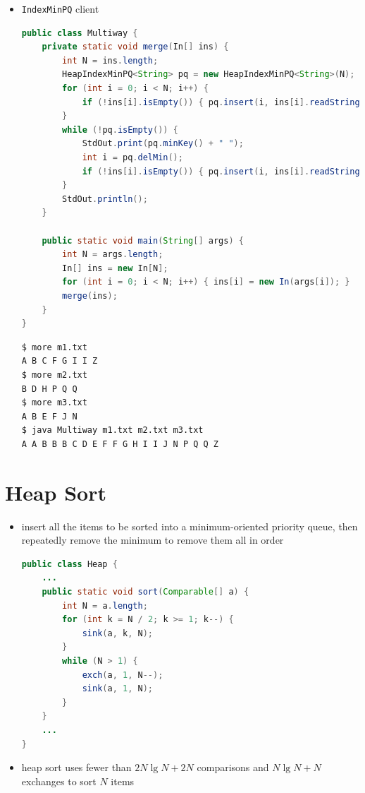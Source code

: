 \documentclass[8pt,a4paper,compress]{beamer}
\begin{document}
\begin{frame}[fragile]
\begin{itemize}
\item \lstinline{IndexMinPQ} client
\begin{lstlisting}[language=Java]
public class Multiway { 
    private static void merge(In[] ins) { 
        int N = ins.length; 
        HeapIndexMinPQ<String> pq = new HeapIndexMinPQ<String>(N); 
        for (int i = 0; i < N; i++) { 
            if (!ins[i].isEmpty()) { pq.insert(i, ins[i].readString()); }
        } 
        while (!pq.isEmpty()) {
            StdOut.print(pq.minKey() + " "); 
            int i = pq.delMin(); 
            if (!ins[i].isEmpty()) { pq.insert(i, ins[i].readString()); }
        }
        StdOut.println();
    } 

    public static void main(String[] args) { 
        int N = args.length; 
        In[] ins = new In[N]; 
        for (int i = 0; i < N; i++) { ins[i] = new In(args[i]); } 
        merge(ins); 
    } 
} 
\end{lstlisting}

\begin{lstlisting}[language={}]
$ more m1.txt 
A B C F G I I Z
$ more m2.txt 
B D H P Q Q
$ more m3.txt 
A B E F J N
$ java Multiway m1.txt m2.txt m3.txt 
A A B B B C D E F F G H I I J N P Q Q Z 
\end{lstlisting}
\end{itemize}
\end{frame}

\section{Heap Sort}
\begin{frame}[fragile]
\begin{itemize}
\item insert all the items to be sorted into a minimum-oriented priority queue, then repeatedly remove the minimum to remove them all in order
\begin{lstlisting}[language=Java]
public class Heap {
    ...
    public static void sort(Comparable[] a) {
        int N = a.length;
        for (int k = N / 2; k >= 1; k--) {
            sink(a, k, N);
        }
        while (N > 1) {
            exch(a, 1, N--);
            sink(a, 1, N);
        }
    }
    ...
}
\end{lstlisting}

\item heap sort uses fewer than $2N \lg N + 2N$ comparisons and $N\lg N + N$ exchanges to sort $N$ items
\end{itemize}
\end{frame}
\end{document}
